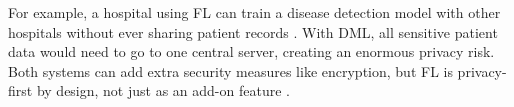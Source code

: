 For example, a hospital using FL can train a disease detection model with other hospitals without ever sharing patient records \cite{Qian2020}. With DML, all sensitive patient data would need to go to one central server, creating an enormous privacy risk. Both systems can add extra security measures like encryption, but FL is privacy-first by design, not just as an add-on feature \cite{Yang2021}.
 